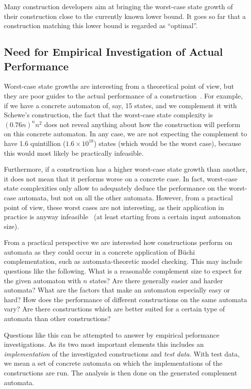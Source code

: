 Many construction developers aim at bringing the worst-case state growth of their construction close to the currently known lower bound. It goes so far that a construction matching this lower bound is regarded as ``optimal''. 


\subsection{Need for Empirical Investigation of Actual Performance}
Worst-case state growths are interesting from a theoretical point of view, but they are poor guides to the actual performance of a construction~\cite{2011_tsai}. For example, if we have a concrete automaton of, say, 15 states, and we complement it with Schewe's construction, the fact that the worst-case state complexity is $(0.76n)^n n^2$ does not reveal anything about how the construction will perform on this concrete automaton. In any case, we are not expecting the complement to have 1.6 quintillion ($1.6 \times 10^{18}$) states (which would be the worst case), because this would most likely be practically infeasible.

Furthermore, if a construction has a higher worst-case state growth than another, it does not mean that it performs worse on a concrete case. In fact, worst-case state complexities only allow to adequately deduce the performance on the worst-case automata, but not on all the other automata. However, from a practical point of view, these worst cases are not interesting, as their application in practice is anyway infeasible~\cite{1995_tasiran} (at least starting from a certain input automaton size).

From a practical perspective we are interested how constructions perform on automata as they could occur in a concrete application of Büchi complementation, such as automata-theoretic model checking. This may include questions like the following. What is a reasonable complement size to expect for the given automaton with $n$ states? Are there generally easier and harder automata? What are the factors that make an automaton especially easy or hard? How does the performance of different constructions on the same automata vary? Are there constructions which are better suited for a certain type of automata than other constructions?

Questions like this can be attempted to answer by empirical peformance investigations. As its two most important elements this includes an \textit{implementation} of the investigated constructions and \textit{test data}. With test data, we mean a set of concrete automata on which the implementations of the constructions are run. The analysis is then done on the generated complement automata.

